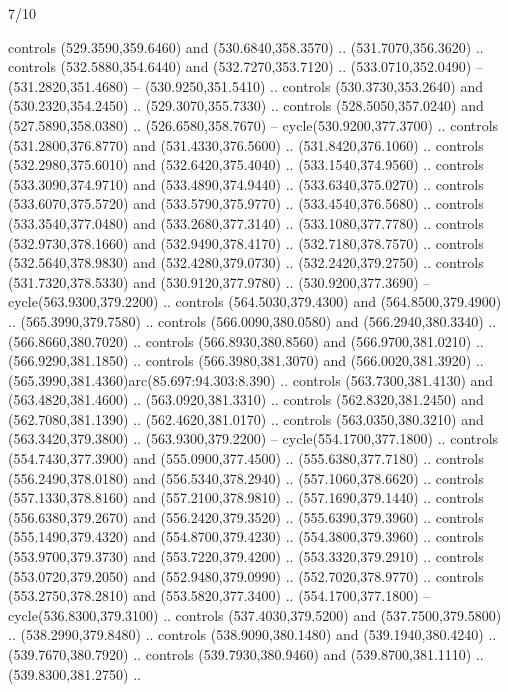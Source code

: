 \begin{flagdescription}{7/10}
\begin{scope}[xshift=0.5\flaglength]
\begin{scope}[scale=0.00185\flagwidth,yshift=245mm,xshift=-43.7mm]
\begin{scope}[y=-0.8pt, x=0.8pt, inner sep=0pt, outer sep=0pt]
\begin{scope}[shift={(-344.0678,183.89831)}]
\begin{scope}[fill=lblue]
  controls (529.3590,359.6460) and (530.6840,358.3570) .. (531.7070,356.3620) ..
  controls (532.5880,354.6440) and (532.7270,353.7120) .. (533.0710,352.0490) --
  (531.2820,351.4680) -- (530.9250,351.5410) .. controls (530.3730,353.2640) and
  (530.2320,354.2450) .. (529.3070,355.7330) .. controls (528.5050,357.0240) and
  (527.5890,358.0380) .. (526.6580,358.7670) -- cycle(530.9200,377.3700) ..
  controls (531.2800,376.8770) and (531.4330,376.5600) .. (531.8420,376.1060) ..
  controls (532.2980,375.6010) and (532.6420,375.4040) .. (533.1540,374.9560) ..
  controls (533.3090,374.9710) and (533.4890,374.9440) .. (533.6340,375.0270) ..
  controls (533.6070,375.5720) and (533.5790,375.9770) .. (533.4540,376.5680) ..
  controls (533.3540,377.0480) and (533.2680,377.3140) .. (533.1080,377.7780) ..
  controls (532.9730,378.1660) and (532.9490,378.4170) .. (532.7180,378.7570) ..
  controls (532.5640,378.9830) and (532.4280,379.0730) .. (532.2420,379.2750) ..
  controls (531.7320,378.5330) and (530.9120,377.9780) .. (530.9200,377.3690) --
  cycle(563.9300,379.2200) .. controls (564.5030,379.4300) and
  (564.8500,379.4900) .. (565.3990,379.7580) .. controls (566.0090,380.0580) and
  (566.2940,380.3340) .. (566.8660,380.7020) .. controls (566.8930,380.8560) and
  (566.9700,381.0210) .. (566.9290,381.1850) .. controls (566.3980,381.3070) and
  (566.0020,381.3920) .. (565.3990,381.4360)arc(85.697:94.303:8.390) .. controls
  (563.7300,381.4130) and (563.4820,381.4600) .. (563.0920,381.3310) .. controls
  (562.8320,381.2450) and (562.7080,381.1390) .. (562.4620,381.0170) .. controls
  (563.0350,380.3210) and (563.3420,379.3800) .. (563.9300,379.2200) --
  cycle(554.1700,377.1800) .. controls (554.7430,377.3900) and
  (555.0900,377.4500) .. (555.6380,377.7180) .. controls (556.2490,378.0180) and
  (556.5340,378.2940) .. (557.1060,378.6620) .. controls (557.1330,378.8160) and
  (557.2100,378.9810) .. (557.1690,379.1440) .. controls (556.6380,379.2670) and
  (556.2420,379.3520) .. (555.6390,379.3960) .. controls (555.1490,379.4320) and
  (554.8700,379.4230) .. (554.3800,379.3960) .. controls (553.9700,379.3730) and
  (553.7220,379.4200) .. (553.3320,379.2910) .. controls (553.0720,379.2050) and
  (552.9480,379.0990) .. (552.7020,378.9770) .. controls (553.2750,378.2810) and
  (553.5820,377.3400) .. (554.1700,377.1800) -- cycle(536.8300,379.3100) ..
  controls (537.4030,379.5200) and (537.7500,379.5800) .. (538.2990,379.8480) ..
  controls (538.9090,380.1480) and (539.1940,380.4240) .. (539.7670,380.7920) ..
  controls (539.7930,380.9460) and (539.8700,381.1110) .. (539.8300,381.2750) ..

\end{scope}
\end{scope}
\end{scope}
\end{scope}
\end{scope}
\end{flagdescription}
